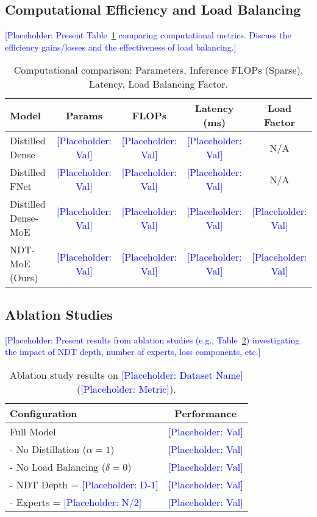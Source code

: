 \documentclass[11pt,a4paper]{article}
\newcommand{\placeholder}[1]{\textcolor{blue}{[Placeholder: #1]}}
\begin{document}
\subsection{Computational Efficiency and Load Balancing}
\placeholder{Present Table~\ref{tab:computation} comparing computational metrics. Discuss the efficiency gains/losses and the effectiveness of load balancing.}
\begin{table}[h!]
    \centering
    \caption{Computational comparison: Parameters, Inference FLOPs (Sparse), Latency, Load Balancing Factor.}
    \label{tab:computation}
    \begin{tabular}{lcccc}
        \toprule
        Model & Params & FLOPs & Latency (ms) & Load Factor \\
        \midrule
        Distilled Dense & \placeholder{Val} & \placeholder{Val} & \placeholder{Val} & N/A \\
        Distilled FNet & \placeholder{Val} & \placeholder{Val} & \placeholder{Val} & N/A \\
        Distilled Dense-MoE & \placeholder{Val} & \placeholder{Val} & \placeholder{Val} & \placeholder{Val} \\
        NDT-MoE (Ours) & \placeholder{Val} & \placeholder{Val} & \placeholder{Val} & \placeholder{Val} \\
        \bottomrule
    \end{tabular}
\end{table}

\subsection{Ablation Studies}
\placeholder{Present results from ablation studies (e.g., Table~\ref{tab:ablation}) investigating the impact of NDT depth, number of experts, loss components, etc.}
\begin{table}[h!]
    \centering
    \caption{Ablation study results on \placeholder{Dataset Name} (\placeholder{Metric}).}
    \label{tab:ablation}
    \begin{tabular}{lc}
        \toprule
        Configuration & Performance \\
        \midrule
        Full Model & \placeholder{Val} \\
        - No Distillation ($\alpha=1$) & \placeholder{Val} \\
        - No Load Balancing ($\delta=0$) & \placeholder{Val} \\
        - NDT Depth = \placeholder{D-1} & \placeholder{Val} \\
        - Experts = \placeholder{N/2} & \placeholder{Val} \\
        \bottomrule
    \end{tabular}
\end{table}
\end{document}
